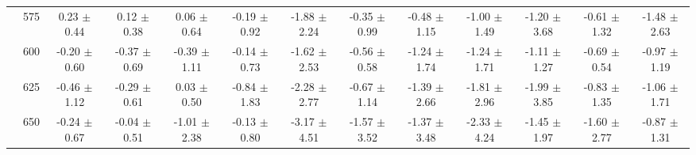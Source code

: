 \begin{table}[h]
{\begin{tabular}{
        ccccccccccccc}
 & 575& 0.23 $\pm$ 0.44& 0.12 $\pm$ 0.38& 0.06 $\pm$ 0.64& -0.19 $\pm$ 0.92& -1.88 $\pm$ 2.24& -0.35 $\pm$ 0.99& -0.48 $\pm$ 1.15& -1.00 $\pm$ 1.49& -1.20 $\pm$ 3.68& -0.61 $\pm$ 1.32& -1.48 $\pm$ 2.63 \\ 
 & 600& -0.20 $\pm$ 0.60& -0.37 $\pm$ 0.69& -0.39 $\pm$ 1.11& -0.14 $\pm$ 0.73& -1.62 $\pm$ 2.53& -0.56 $\pm$ 0.58& -1.24 $\pm$ 1.74& -1.24 $\pm$ 1.71& -1.11 $\pm$ 1.27& -0.69 $\pm$ 0.54& -0.97 $\pm$ 1.19 \\ 
 & 625& -0.46 $\pm$ 1.12& -0.29 $\pm$ 0.61& 0.03 $\pm$ 0.50& -0.84 $\pm$ 1.83& -2.28 $\pm$ 2.77& -0.67 $\pm$ 1.14& -1.39 $\pm$ 2.66& -1.81 $\pm$ 2.96& -1.99 $\pm$ 3.85& -0.83 $\pm$ 1.35& -1.06 $\pm$ 1.71 \\ 
 & 650& -0.24 $\pm$ 0.67& -0.04 $\pm$ 0.51& -1.01 $\pm$ 2.38& -0.13 $\pm$ 0.80& -3.17 $\pm$ 4.51& -1.57 $\pm$ 3.52& -1.37 $\pm$ 3.48& -2.33 $\pm$ 4.24& -1.45 $\pm$ 1.97& -1.60 $\pm$ 2.77& -0.87 $\pm$ 1.31 \\ \hline 

        \end{tabular}%
        }

        \end{table}
        
